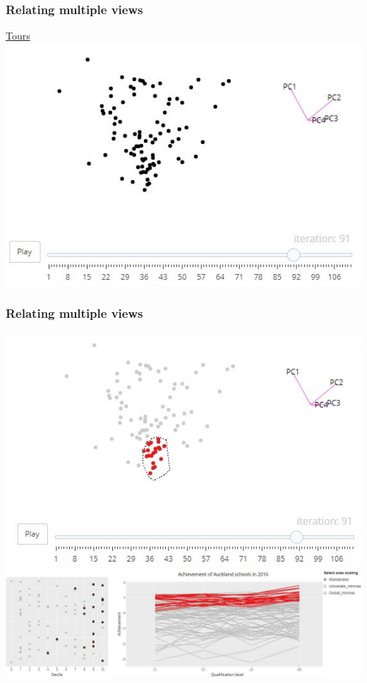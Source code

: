 \documentclass{beamer}
\begin{document}
	\begin{frame}
		\frametitle{Relating multiple views}
		\href{https://shanl33.shinyapps.io/nceatour/}{Tours} \\
		\includegraphics[scale=0.4]{files/tour_hole.jpeg}
	\end{frame}

	\begin{frame}
		\frametitle{Relating multiple views}
			\includegraphics[scale=0.23]{files/tour_brushed2.jpeg}\\
			\includegraphics[scale=0.24]{files/link_brush.jpeg}
	\end{frame}
\end{document}
